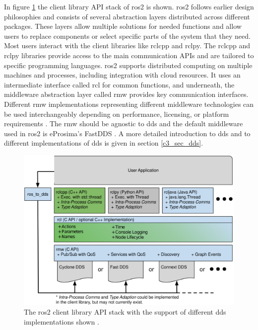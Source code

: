 In figure \ref{c3_fig_ros2_stack} the client library API stack of \gls{ros2} is shown. \gls{ros2} follows earlier design philosophies and consists of several abstraction layers distributed across different packages. These layers allow multiple solutions for needed functions and allow users to replace components or select specific parts of the system that they need. Most users interact with the client libraries like \gls{rclcpp} and \gls{rclpy}. The \gls{rclcpp} and \gls{rclpy} libraries provide access to the main communication APIs and are tailored to specific programming languages. \gls{ros2} supports distributed computing on multiple machines and processes, including integration with cloud resources. It uses an intermediate interface called \gls{rcl} for common functions, and underneath, the middleware abstraction layer called \gls{rmw} provides key communication interfaces. Different \gls{rmw} implementations representing different middleware technologies can be used interchangeably depending on performance, licensing, or platform requirements \cite{rico_concise_2022, macenski_robot_2022, liao_introduction_2020}. \newline
The \gls{rmw} should be agnostic to \gls{dds} and the default middleware used in \gls{ros2} is eProsima's FastDDS \cite{macenski_robot_2022, noauthor_ros_nodate-1, noauthor_eprosima_nodate}. A more detailed introduction to \gls{dds} and to different implementations of \gls{dds} is given in section \ref{c3_sec_dds}.
\begin{figure}[htbp]
	\centering
	\includegraphics[width=1\textwidth]{Figures/c3/ros2_client_library_stack.png}
	\caption{The \gls{ros2} client library API stack with the support of different \gls{dds} implementations shown \cite{macenski_robot_2022}.}
	\label{c3_fig_ros2_stack}
\end{figure}

